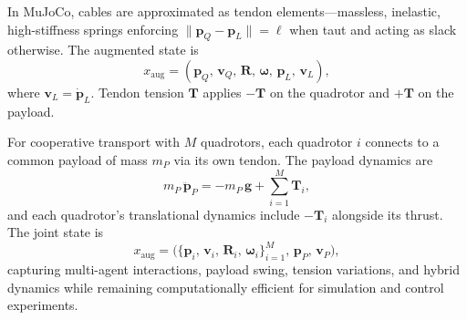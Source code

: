 In MuJoCo, cables are approximated as tendon elements—massless, inelastic, high-stiffness springs enforcing \(\|\mathbf{p}_Q - \mathbf{p}_L\| = \ell\) when taut and acting as slack otherwise. The augmented state is
\[
x_{\mathrm{aug}} = (\mathbf{p}_Q,\,\mathbf{v}_Q,\,\mathbf{R},\,\boldsymbol{\omega},\,\mathbf{p}_L,\,\mathbf{v}_L),
\]
where \(\mathbf{v}_L = \dot{\mathbf{p}}_L\). Tendon tension \(\mathbf{T}\) applies \(-\mathbf{T}\) on the quadrotor and \(+\mathbf{T}\) on the payload.

For cooperative transport with \(M\) quadrotors, each quadrotor \(i\) connects to a common payload of mass \(m_P\) via its own tendon. The payload dynamics are
\[
m_P \,\ddot{\mathbf{p}}_P = -m_P\,\mathbf{g} + \sum_{i=1}^M \mathbf{T}_i,
\]
and each quadrotor's translational dynamics include \(-\mathbf{T}_i\) alongside its thrust. The joint state is
\[
x_{\mathrm{aug}} = \bigl(\{\mathbf{p}_i,\,\mathbf{v}_i,\,\mathbf{R}_i,\,\boldsymbol{\omega}_i\}_{i=1}^M,\,\mathbf{p}_P,\,\mathbf{v}_P\bigr),
\]
capturing multi-agent interactions, payload swing, tension variations, and hybrid dynamics while remaining computationally efficient for simulation and control experiments.
